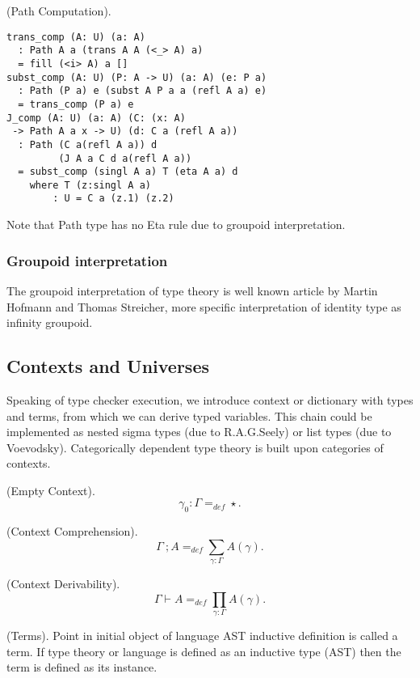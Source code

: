 \documentclass{article}
\begin{document}
\begin{theorem} (Path Computation).
\begin{lstlisting}
trans_comp (A: U) (a: A)
  : Path A a (trans A A (<_> A) a)
  = fill (<i> A) a []
subst_comp (A: U) (P: A -> U) (a: A) (e: P a)
  : Path (P a) e (subst A P a a (refl A a) e)
  = trans_comp (P a) e
J_comp (A: U) (a: A) (C: (x: A)
 -> Path A a x -> U) (d: C a (refl A a))
  : Path (C a(refl A a)) d
         (J A a C d a(refl A a))
  = subst_comp (singl A a) T (eta A a) d
    where T (z:singl A a)
        : U = C a (z.1) (z.2)
\end{lstlisting}
\end{theorem}

Note that  Path type has no Eta rule due to groupoid interpretation.

\subsubsection*{Groupoid interpretation}
The groupoid interpretation of type theory is well known article by Martin Hofmann and Thomas Streicher,
more specific interpretation of identity type as infinity groupoid.

\subsection{Contexts and Universes}
Speaking of type checker execution, we introduce context or dictionary with types and terms,
from which we can derive typed variables. This chain could be implemented as
nested sigma types (due to R.A.G.Seely) or list types (due to Voevodsky). Categorically
dependent type theory is built upon categories of contexts.

\begin{definition} (Empty Context).
$$
    \gamma_0 : \Gamma =_{def} \star.
$$
\end{definition}

\begin{definition} (Context Comprehension).
$$
\Gamma\ ; A =_{def} \sum_{\gamma:\Gamma}A(\gamma).
$$
\end{definition}

\begin{definition} (Context Derivability).
$$
\Gamma \vdash A =_{def} \prod_{\gamma:\Gamma}A(\gamma).
$$
\end{definition}

\begin{definition} (Terms). Point in initial object of language AST
inductive definition is called a term. If type theory or language is defined as
an inductive type (AST) then the term is defined as its instance.
\end{definition}
\end{document}
